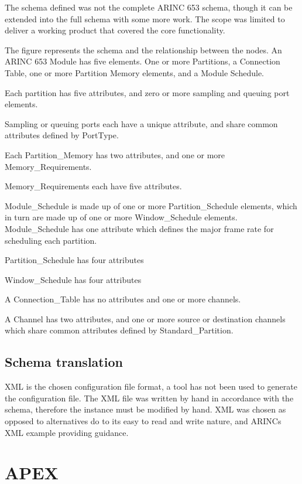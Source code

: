 The schema defined was not the complete ARINC 653 schema, though it can be extended into the full schema with some more work. The scope was limited to deliver a working product that covered the core functionality.

The figure represents the schema and the relationship between the nodes. An ARINC 653 Module has five elements. One or more Partitions, a Connection Table, one or more Partition Memory elements, and a Module Schedule.

Each partition has five attributes, and zero or more sampling and queuing port elements. 

Sampling or queuing ports each have a unique attribute, and share common attributes defined by PortType.  


Each Partition\_Memory has two attributes, and one or more Memory\_Requirements.

Memory\_Requirements each have five attributes.


Module\_Schedule is made up of one or more Partition\_Schedule elements, which in turn are made up of one or more Window\_Schedule elements. Module\_Schedule has one attribute which defines the major frame rate for scheduling each partition. 

Partition\_Schedule has four attributes

Window\_Schedule has four attributes


A Connection\_Table has no attributes and one or more channels.

A Channel has two attributes, and one or more source or destination channels which share common attributes defined by Standard\_Partition.  

\subsection{Schema translation}


XML is the chosen configuration file format, a tool has not been used to generate the configuration file. The XML file was written by hand in accordance with the schema, therefore the instance must be modified by hand. XML was chosen as opposed to alternatives do to its easy to read and write nature, and ARINC\textquotesingle s XML example providing guidance.


\section{APEX}


